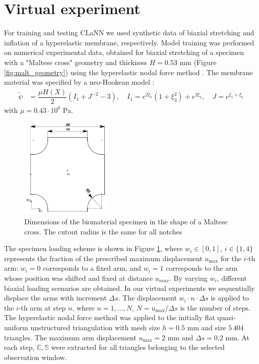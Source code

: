 \section{Virtual experiment}

For training and testing CLaNN we used synthetic data of biaxial stretching and inflation of a hyperelastic membrane, respectively.
Model training was performed on numerical experimental data, 
obtained for biaxial stretching of a specimen with a "Maltese cross" geometry and thickness $H=0.53$ mm (Figure \ref{fig:malt_geometry}) using the hyperelastic nodal force method \cite{ddaniso2024}. 
The membrane material was specified by a neo-Hookean model \cite{ogden1997nonlinear}:
\begin{align} \label{eq:neohook}
        \widetilde{\psi} &= \dfrac{\mu H(X)}{2} (I_1 +J^{-2}-3),
        \quad     I_1 = e^{2\xi_1} (1+\xi_3^2)+e^{2\xi_2},\quad J = e^{\xi_1+\xi_2}
\end{align}
with $\mu=0.43\cdot 10^6$ Pa.


\begin{figure}[H]
  \centering
\includegraphics[width=0.4\textwidth]{../img/malt_geom.png}
\caption{Dimensions of the biomaterial specimen in the shape of a Maltese cross. 
  The cutout radius is the same for all notches}
  \label{fig:malt_geometry}
  \label{fig:malt_displacements}
\end{figure}

The specimen loading scheme is shown in Figure \ref{fig:malt_displacements}, where $w_i \in [0,1]$, $i \in \{1,4\}$
represents the fraction of the prescribed maximum displacement $u_{\max}$ for the $i$-th arm: $w_i = 0$ 
corresponds to a fixed arm, and $w_i = 1$ corresponds to the arm whose position was shifted and fixed at distance $u_{max}$. 
By varying $w_i$, different biaxial loading scenarios are obtained. 
In our virtual experiments we sequentially
displace the arms with increment $\Delta s$. 
The displacement $w_i \cdot n \cdot \Delta s$ is applied to the $i$-th arm at step $n$, where $n = 1, \ldots, N$, 
$N = u_{\max}/\Delta s$ is the number of steps. 
The hyperelastic nodal force method was applied to the initially flat quasi-uniform unstructured triangulation with mesh size $h=0.5$ mm and size $5\,404$ triangles. The maximum arm displacement
$u_{\max} = 2$ mm and $\Delta s = 0.2$ mm.
At each step, $\mathbb{C}, \mathbb{S}$ were extracted for all triangles belonging to the selected observation window. 

